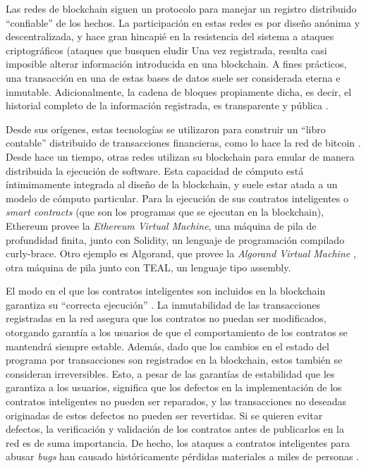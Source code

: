 Las redes de blockchain siguen un protocolo para manejar un registro distribuido ``confiable'' de los hechos.
La participación en estas redes es por diseño anónima y descentralizada, y hace gran hincapié en la resistencia del sistema a ataques criptográficos (ataques que busquen eludir  
Una vez registrada, resulta casi imposible  alterar información introducida en una blockchain.
A fines prácticos, una transacción en una de estas bases de datos suele ser considerada eterna e inmutable.
Adicionalmente, la cadena de bloques propiamente dicha, es decir, el historial completo de la información registrada, es transparente y pública \cite{bitcoin-overview}.

Desde sus orígenes, estas tecnologías se utilizaron para construir un ``libro contable'' distribuido  de transacciones financieras, como lo hace la red de bitcoin \cite{??}.
Desde hace un tiempo, otras redes utilizan su blockchain para emular de manera distribuida la ejecución de software.
Esta capacidad de cómputo está íntimimamente integrada al diseño de la blockchain, y suele estar atada a un modelo de cómputo particular.
Para la ejecución de sus contratos inteligentes o \textit{smart contracts} (que son los programas que se ejecutan en la blockchain), Ethereum provee la \emph{Ethereum Virtual Machine}\cite{ethereum-yellow-paper}, una máquina de pila de profundidad finita, junto con Solidity\cite{solidity}, un lenguaje de programación compilado curly-brace.
Otro ejemplo es Algorand, que provee la \textit{Algorand Virtual Machine} \cite{algorand-avm}, otra máquina de pila junto con TEAL, un lenguaje tipo assembly.

El modo en el que los contratos inteligentes son incluidos en la blockchain garantiza su ``correcta ejecución'' \cite{??}.
La inmutabilidad de las transacciones registradas en la red asegura que los contratos no puedan ser modificados, otorgando garantía a los usuarios de que el comportamiento de los contratos se mantendrá siempre estable.
Además, dado que los cambios en el estado del programa por transacciones son registrados en la blockchain, estos también se consideran irreversibles.
Esto, a pesar de las garantías de estabilidad que les garantiza a los usuarios, significa que los defectos en la implementación de los contratos inteligentes no pueden ser reparados, y las transacciones no deseadas originadas de estos defectos no pueden ser revertidas.
Si se quieren evitar defectos, la verificación y validación de los contratos antes de publicarlos en la red es de suma importancia.
De hecho, los ataques a contratos inteligentes para abusar \textit{bugs} han causado históricamente pérdidas materiales a miles de personas \cite{DAO}.

